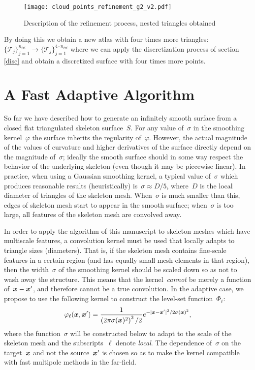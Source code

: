 \documentclass[11pt]{article}
\numberwithin{equation}{section}
\newcommand{\vct}{\vectorsym}
\newcommand{\lp}{\left(}
\newcommand{\rp}{\right)}
\newcommand\bx{\vct{x}}
\renewcommand{\phi}{\varphi}
\begin{document}
\begin{figure}[H]
\begin{center}
\texttt{[image: cloud\_points\_refinement\_g2\_v2.pdf]}%
\end{center}
\caption{Description of the refinement process, nested triangles obtained}
\label{refinement3}
\end{figure}


By doing this we obtain a new atlas with four times more triangles:
$\{\mathcal{T}_j\}_{j=1}^{n_{tri}}\rightarrow
\{\mathcal{T}_j\}_{j=1}^{4\cdot n_{tri}}$ where we can apply the
discretization process of section \ref{disc} and obtain a discretized
surface with four times more points.








\section{A Fast Adaptive Algorithm}
\label{sec:adaptive}

So far we have described how to generate an infinitely smooth surface
from a closed flat triangulated skeleton surface~$S$. For any value
of~$\sigma$ in the smoothing kernel~$\phi$ the surface inherits the
regularity of~$\phi$. However, the actual magnitude of the values of
curvature and higher derivatives of the surface directly depend on the
magnitude of~$\sigma$; ideally the smooth surface should in some way
respect the behavior of the underlying skeleton (even though it may be
piecewise linear). In practice, when using a Gaussian smoothing
kernel, a typical value of~$\sigma$ which produces reasonable results
(heuristically) is~$\sigma \approx D/5$, where~$D$ is the local
diameter of triangles of the skeleton mesh. When~$\sigma$ is much
smaller than this, edges of skeleton mesh start to appear in the
smooth surface; when~$\sigma$ is too large, all features of the
skeleton mesh are convolved away.

In order to apply the algorithm of this manuscript to skeleton meshes
which have multiscale features, a convolution kernel must be used that
locally adapts to triangle sizes (diameters).
That is, if the skeleton mesh contains fine-scale features in a
certain region (and has equally small mesh elements in that region),
then the width~$\sigma$ of the smoothing kernel should be scaled down
so as not to wash away the structure. This means that the
kernel~\emph{cannot} be merely a function of~$\bx-\bx'$, and therefore
cannot be a true convolution.
In the adaptive case,
we propose to use the following kernel to construct the level-set
function~$\Phi_\ell$:
\begin{equation}
  \phi_\ell(\bx,\bx') = \frac{1}{\lp 2\pi \sigma(\bx)^2 \rp^3/2}
  e^{-|\bx-\bx'|^2/2\sigma(\bx)^2},
\end{equation}
where the function~$\sigma$ will be constructed below to adapt to the
scale of the skeleton mesh and the subscripts~$\ell$ denote
\emph{local}. The dependence of~$\sigma$ on the target~$\bx$ and not
the source~$\bx'$ is chosen so as to make the kernel compatible with
fast multipole methods in the far-field.
\end{document}
